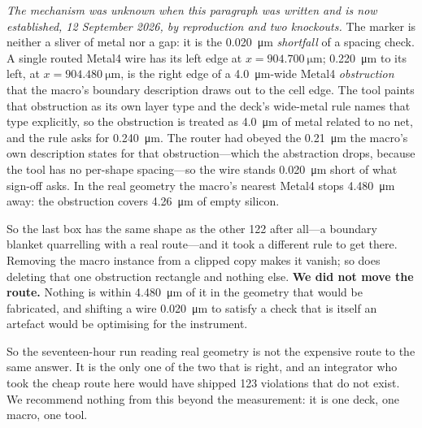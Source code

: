 \documentclass[11pt,a4paper]{article}
\begin{document}
\emph{The mechanism was unknown when this paragraph was written and is
now established, 12 September 2026, by reproduction and two knockouts.}
The marker is neither a sliver of metal nor a gap: it is the
\SI{0.020}{\micro\meter} \emph{shortfall} of a spacing check. A
single routed Metal4 wire has its left edge at $x =
\SI{904.700}{\micro\meter}$; \SI{0.220}{\micro\meter} to its left,
at $x = \SI{904.480}{\micro\meter}$, is the right edge of a
\SI{4.0}{\micro\meter}-wide Metal4 \emph{obstruction} that the
macro's boundary description draws out to the cell edge. The tool paints
that obstruction as its own layer type and the deck's wide-metal rule
names that type explicitly, so the obstruction is treated as
\SI{4.0}{\micro\meter} of metal related to no net, and the rule asks
for \SI{0.240}{\micro\meter}. The router had obeyed the
\SI{0.21}{\micro\meter} the macro's own description states for that
obstruction---which the abstraction drops, because the tool has no
per-shape spacing---so the wire stands \SI{0.020}{\micro\meter} short
of what sign-off asks. In the real geometry the macro's nearest Metal4
stops \SI{4.480}{\micro\meter} away: the obstruction covers
\SI{4.26}{\micro\meter} of empty silicon.

So the last box has the same shape as the other 122 after all---a
boundary blanket quarrelling with a real route---and it took a different
rule to get there. Removing the macro instance from a clipped copy makes
it vanish; so does deleting that one obstruction rectangle and nothing
else. \textbf{We did not move the route.} Nothing is within
\SI{4.480}{\micro\meter} of it in the geometry that would be
fabricated, and shifting a wire \SI{0.020}{\micro\meter} to satisfy a
check that is itself an artefact would be optimising for the
instrument.

So the seventeen-hour run reading real geometry is not the expensive
route to the same answer. It is the only one of the two that is right,
and an integrator who took the cheap route here would have shipped 123
violations that do not exist. We recommend nothing from this beyond the
measurement: it is one deck, one macro, one tool.
\end{document}
